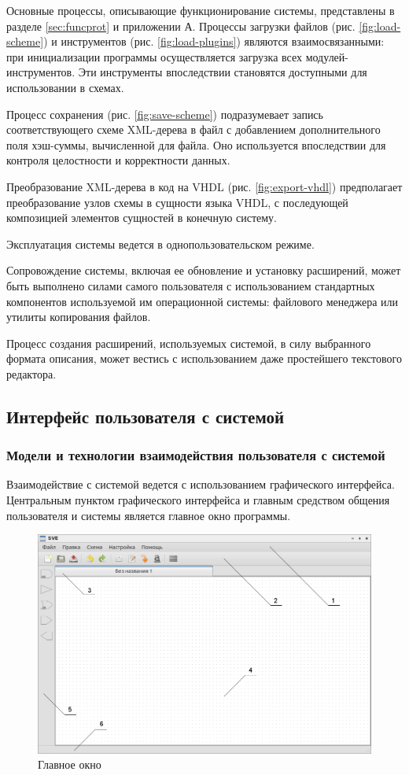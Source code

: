 Основные процессы, описывающие функционирование системы, представлены в разделе \ref{sec:funcprot} и приложении А.
Процессы загрузки файлов (рис. \ref{fig:load-scheme}) и инструментов (рис. \ref{fig:load-plugins}) являются взаимосвязанными: при инициализации программы осуществляется загрузка всех модулей-инструментов.
Эти инструменты впоследствии становятся доступными для использовании в схемах.

Процесс сохранения (рис. \ref{fig:save-scheme}) подразумевает запись соответствующего схеме XML-дерева в файл с добавлением дополнительного поля хэш-суммы, вычисленной для файла.
Оно используется впоследствии для контроля целостности и корректности данных.

Преобразование XML-дерева в код на VHDL (рис. \ref{fig:export-vhdl}) предполагает преобразование узлов схемы в сущности языка VHDL, с последующей композицией элементов сущностей в конечную систему.

Эксплуатация системы ведется в однопользовательском режиме.

Сопровождение системы, включая ее обновление и установку расширений, может быть выполнено силами самого пользователя с использованием стандартных компонентов используемой им операционной системы: файлового менеджера или утилиты копирования файлов.

Процесс создания расширений, используемых системой, в силу выбранного формата описания, может вестись с использованием даже простейшего текстового редактора.

\subsection{Интерфейс пользователя с системой}

\subsubsection{Модели и технологии взаимодействия пользователя с системой} \label{sec:model-tech}

Взаимодействие с системой ведется с использованием графического интерфейса.
Центральным пунктом графического интерфейса и главным средством общения пользователя и системы является главное окно программы.
\begin{figure}[H]
  \centering
  \includegraphics[width=1\textwidth]{gui/main-window.png}
  \caption{Главное окно}
\end{figure}


